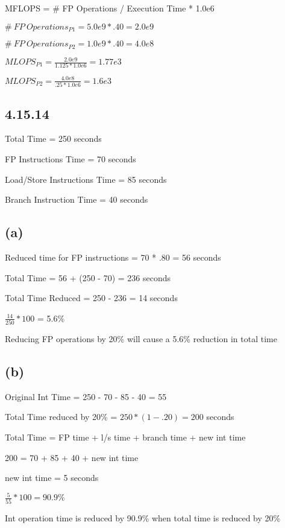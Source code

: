 \documentclass{article}
\begin{document}
    MFLOPS = \# FP Operations / Execution Time * 1.0e6

    $\#\ FP\ Operations_{P1} = 5.0e9 * .40 = 2.0e9$

    $\#\ FP\ Operations_{P2} = 1.0e9 * .40 = 4.0e8$
    \vspace*{6pt}

    $MLOPS_{P1} = \frac{2.0e9}{1.125 * 1.0e6} = 1.77e3$
    \vspace*{6pt}

    $MLOPS_{P2} = \frac{4.0e8}{.25 * 1.0e6} = 1.6e3$
    
    \subsection*{4.15.14}

    Total Time = 250 seconds

    FP Instructions Time = 70 seconds

    Load/Store Instructions Time = 85 seconds

    Branch Instruction Time = 40 seconds

    \subsection*{(a)}

    Reduced time for FP instructions = 70 * .80 = 56 seconds

    Total Time = 56 + (250 - 70) = 236 seconds

    Total Time Reduced = 250 - 236 = 14 seconds

    $\frac{14}{250} * 100$ = 5.6\%

    Reducing FP operations by 20\% will cause a 5.6\% reduction in total time

    \subsection*{(b)}

    Original Int Time = 250 - 70 - 85 - 40 = 55

    Total Time reduced by 20\% = $250 * (1-.20) = 200$ seconds

    Total Time = FP time + l/s time + branch time + new int time

    200 = 70 + 85 + 40 + new int time

    new int time = 5 seconds

    $\frac{5}{55} * 100 = 90.9\%$

    Int operation time is reduced by 90.9\% when total time is reduced by 20\%
\end{document}
